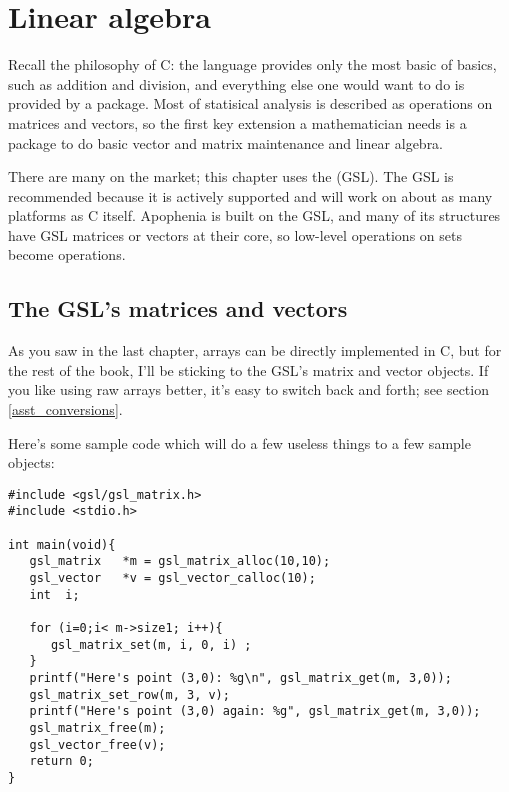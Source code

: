 \chapter[Linear Algebra]{Linear algebra} \label{linear_algebra}

Recall the philosophy of C: the language provides only the most basic of
basics, such as addition and division, and everything else one would
want to do is provided by a package. Most of statisical analysis is
described as operations on matrices and vectors, so the first key
extension a mathematician needs is a package to do basic vector and
matrix maintenance and linear algebra.

There are many on the market; this chapter uses the  (GSL). The GSL is recommended because it is actively supported
and will work on about as many platforms as C itself. Apophenia is built
on the GSL, and many of its structures have GSL matrices or vectors at
their core, so low-level operations on  sets become
 operations.

\section{The GSL's matrices and vectors}
As you saw in the last chapter, arrays can be directly implemented in C, but for
the rest of the book, I'll be sticking to the GSL's matrix and vector objects.
If you like using raw arrays better, it's easy to switch back and forth; see
section \ref{asst_conversions}.


Here's some sample code which will do a few useless things to a few sample
objects:\label{gslexample}
\begin{lstlisting}
#include <gsl/gsl_matrix.h>
#include <stdio.h>

int main(void){
   gsl_matrix   *m = gsl_matrix_alloc(10,10);
   gsl_vector   *v = gsl_vector_calloc(10);
   int  i;

   for (i=0;i< m->size1; i++){
      gsl_matrix_set(m, i, 0, i) ;
   }
   printf("Here's point (3,0): %g\n", gsl_matrix_get(m, 3,0));
   gsl_matrix_set_row(m, 3, v);
   printf("Here's point (3,0) again: %g", gsl_matrix_get(m, 3,0));
   gsl_matrix_free(m);
   gsl_vector_free(v);
   return 0;
}
\end{lstlisting}

